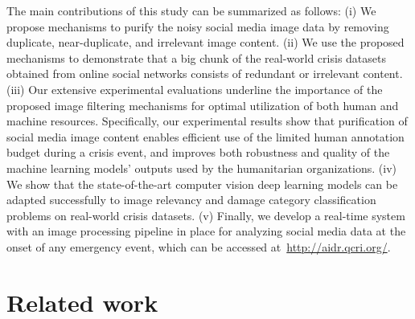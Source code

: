 \documentclass{iscram}
\begin{document}
The main contributions of this study can be summarized as follows: (i) We propose mechanisms to purify the noisy social media image data by removing duplicate, near-duplicate, and irrelevant image content. (ii) We use the proposed mechanisms to demonstrate that a big chunk of the real-world crisis datasets obtained from online social networks consists of redundant or irrelevant content. (iii) Our extensive experimental evaluations underline the importance of the proposed image filtering mechanisms for optimal utilization of both human and machine resources. Specifically, our experimental results show that purification of social media image content enables efficient use of the limited human annotation budget during a crisis event, and improves both robustness and quality of the machine learning models' outputs used by the humanitarian organizations. (iv) We show that the state-of-the-art computer vision deep learning models can be adapted successfully to image relevancy and damage category classification problems on real-world crisis datasets. (v) Finally, we develop a real-time system with an image processing pipeline in place for analyzing social media data at the onset of any emergency event, which can be accessed at~\url{http://aidr.qcri.org/}.
\section{Related work}%
\end{document}
